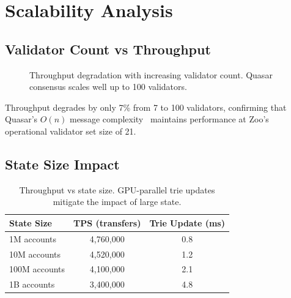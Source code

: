 \section{Scalability Analysis}


\subsection{Validator Count vs Throughput}

\begin{figure}[t]
\centering
{}
\caption{Throughput degradation with increasing validator count. Quasar consensus scales well up to 100 validators.}
\label{fig:scaling}
\end{figure}

Throughput degrades by only 7\% from 7 to 100 validators, confirming that Quasar's $O(n)$ message complexity~\cite{lux-quasar-benchmarks} maintains performance at Zoo's operational validator set size of 21.

\subsection{State Size Impact}

\begin{table}[t]
\centering
\begin{tabular}{lcc}
\toprule
\textbf{State Size} & \textbf{TPS (transfers)} & \textbf{Trie Update (ms)} \\
\midrule
1M accounts & 4,760,000 & 0.8 \\
10M accounts & 4,520,000 & 1.2 \\
100M accounts & 4,100,000 & 2.1 \\
1B accounts & 3,400,000 & 4.8 \\
\bottomrule
\end{tabular}
\caption{Throughput vs state size. GPU-parallel trie updates mitigate the impact of large state.}
\label{tab:state}
\end{table}


